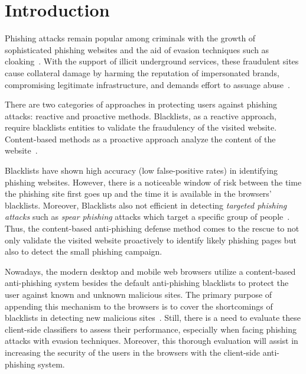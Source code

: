 \section{Introduction}
\label{s:intro}

Phishing attacks remain popular among criminals with the growth of sophisticated phishing websites and the aid of evasion techniques such as cloaking~\cite{oest2020phishtime,hao2013understanding,internet-crime-complaint-center-(ic3)-business-e-mail-compromise-the-12-billion-dollar-scam}. 
With the support of illicit underground services, these fraudulent sites cause collateral damage by harming the reputation of impersonated brands, compromising legitimate infrastructure, and demands effort to assuage abuse~\cite{zhang2007cantina}.

There are two categories of approaches in protecting users against phishing attacks: reactive and proactive methods. Blacklists, as a reactive approach, require blacklists entities to validate the fraudulency of the visited website. Content-based methods as a proactive approach analyze the content of the website~\cite{wang2011verilogo}.

Blacklists have shown high accuracy (low false-positive rates) in identifying phishing websites. However, there is a noticeable window of risk between the time the phishing site first goes up and the time it is available in the browsers' blacklists. Moreover, Blacklists also not efficient in detecting \textit{targeted phishing attacks} such as \textit{spear phishing} attacks which target a specific group of people~\cite{burns2019spear}.
Thus, the content-based anti-phishing defense method comes to the rescue to not only validate the visited website proactively to identify likely phishing pages but also to detect the small phishing campaign.

Nowadays, the modern desktop and mobile web browsers utilize a content-based anti-phishing system besides the default anti-phishing blacklists to protect the user against known and unknown malicious sites. The primary purpose of appending this mechanism to the browsers is to cover the shortcomings of blacklists in detecting new malicious sites~\cite{googlechromeprivacywhitepaper}. Still, there is a need to evaluate these client-side classifiers to assess their performance, especially when facing phishing attacks with evasion techniques. Moreover, this thorough evaluation will assist in increasing the security of the users in the browsers with the client-side anti-phishing system.

